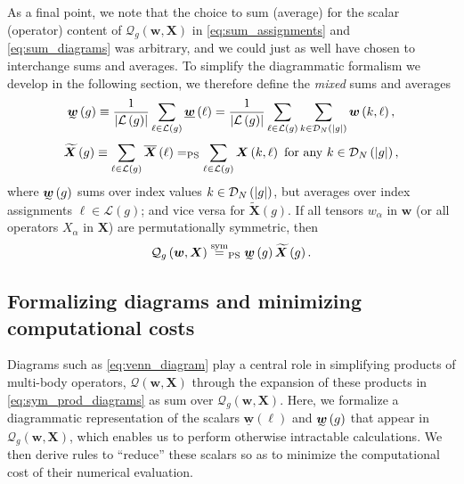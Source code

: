 \documentclass[nofootinbib,notitlepage,11pt]{revtex4-2}
\renewcommand{\t}{\text} %
\newcommand{\f}[2]{\dfrac{#1}{#2}} %
\newcommand{\p}[1]{\left(#1\right)} %
\newcommand{\m}{\bm} %
\newcommand{\1}{\mathds{1}}
\newcommand{\D}{\mathcal{D}}
\renewcommand{\L}{\mathcal{L}}
\newcommand{\Q}{\mathcal{Q}}
\newcommand{\EQPS}{=_{\text{PS}}}
\newcommand{\ut}{\undertilde}
\newcommand{\ot}{\widetilde}
\newcommand{\col}{\underline}
\newcommand{\mean}{\overline}
\begin{document}
As a final point, we note that the choice to sum (average) for the scalar (operator) content of $\Q_g\p{\m w,\m X}$ in \eqref{eq:sum_assignments} and \eqref{eq:sum_diagrams} was arbitrary, and we could just as well have chosen to interchange sums and averages.
To simplify the diagrammatic formalism we develop in the following section, we therefore define the {\it mixed} sums and averages
\begin{align}
  \ut{\m w}\p{g} \equiv \f1{\abs{\L\p{g}}}
  \sum_{\ell\in\L\p{g}} \col{\m w}\p{\ell}
  = \f1{\abs{\L\p{g}}} \sum_{\ell\in\L\p{g}}
  \sum_{k\in\D_N\p{\abs{g}}} \m w\p{k,\ell},
\end{align}
\begin{align}
  \ot{\m X}\p{g} \equiv \sum_{\ell\in\L\p{g}} \mean{\m X}\p{\ell}
  \EQPS \sum_{\ell\in\L\p{g}} \m X\p{k,\ell}
  ~\t{for any}~ k\in\D_N\p{\abs{g}},
\end{align}
where $\ut{\m w}\p{g}$ sums over index values $k\in\D_N\p{\abs{g}}$, but averages over index assignments $\ell\in\L\p{g}$; and vice versa for $\ot{\m X}\p{g}$.
If all tensors $w_\alpha$ in $\m w$ (or all operators $X_\alpha$ in $\m X$) are permutationally symmetric, then
\begin{align}
  \Q_g\p{\m w,\m X} \stackrel{\t{sym}}{=}_{\t{PS}}
  \ut{\m w}\p{g} \ot{\m X}\p{g}.
  \label{eq:sum_diagrams_alt}
\end{align}

\subsection{Formalizing diagrams and minimizing computational costs}
\label{sec:diagrams}

Diagrams such as \eqref{eq:venn_diagram} play a central role in simplifying products of multi-body operators, $\Q\p{\m w,\m X}$ through the expansion of these products in \eqref{eq:sym_prod_diagrams} as sum over $\Q_g\p{\m w,\m X}$.
Here, we formalize a diagrammatic representation of the scalars $\col{\m w}\p{\ell}$ and $\ut{\m w}\p{g}$ that appear in $\Q_g\p{\m w,\m X}$, which enables us to perform otherwise intractable calculations.
We then derive rules to ``reduce'' these scalars so as to minimize the computational cost of their numerical evaluation.
\end{document}
